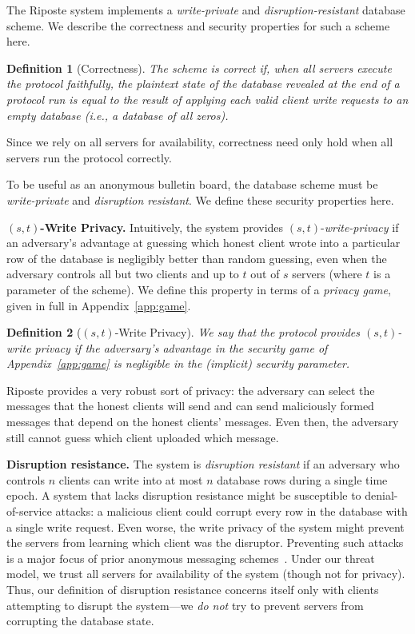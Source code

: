 \documentclass[10pt,twocolumn]{article}
\newtheorem{defn}{Definition}
\newcommand{\nicepara}[1]{\medskip\noindent\textbf{#1.}}
\newcommand{\name}{Riposte\xspace}
\newcommand{\Name}{Riposte\xspace}
\begin{document}
The \name system implements a {\em write-private} and {\em disruption-resistant} 
database scheme. We describe the correctness and security properties for such 
a scheme here.

\begin{defn}[Correctness]
The scheme is {\em correct} if,
when all servers execute the protocol
faithfully, the plaintext state of the database revealed
at the end of a protocol run
is equal to the result of applying
each valid client write requests to an empty database
(i.e., a database of all zeros).
\end{defn}

Since we rely on all servers for availability,
correctness need only hold when all servers 
run the protocol correctly.

\medskip

To be useful as an anonymous bulletin board, the database
scheme must be {\em write-private} and {\em disruption resistant}.
We define these security properties here.

\nicepara{$(s,t)$-Write Privacy}
Intuitively, the system provides $(s,t)$-{\em write-privacy} if an 
adversary's advantage at guessing which honest
client wrote into a particular row of the database
is negligibly better than random guessing, even 
when the adversary controls all but two clients
and up to $t$ out of $s$ servers 
(where $t$ is a parameter of the scheme).
We define this property in terms of a {\em privacy game},
given in full in Appendix~\ref{app:game}.

\begin{defn}[$(s,t)$-Write Privacy]
We say that the protocol provides $(s,t)$-{\em write privacy} if the adversary's advantage
in the security game of Appendix~\ref{app:game}
is negligible in the (implicit) security parameter.
\end{defn}

\Name provides a very robust sort of privacy:
the adversary can select the messages that the honest clients will send and
can send maliciously formed messages that depend on the honest clients' messages.
Even then, the adversary still cannot guess which client uploaded which message.



\nicepara{Disruption resistance}
The system is {\em disruption resistant}
if an adversary who controls $n$ clients
can write into at most $n$ database rows during
a single time epoch.
A system that lacks disruption resistance might
be susceptible to denial-of-service attacks:
a malicious client could corrupt every row in the database
with a single write request.
Even worse, the write privacy of the system might prevent
the servers from learning which client was the disruptor.
Preventing such attacks is a major focus of prior
anonymous messaging schemes~\cite{chaum1988dining,goel2003herbivore,golle2004dining,waidner1989dining,wolinsky2012dissent}.
Under our threat model, we trust all servers for
availability of the system (though not for privacy).
Thus, our definition of disruption resistance concerns
itself only with clients attempting to disrupt the
system---we {\em do not} try to prevent servers
from corrupting the database state.
 
\end{document}
